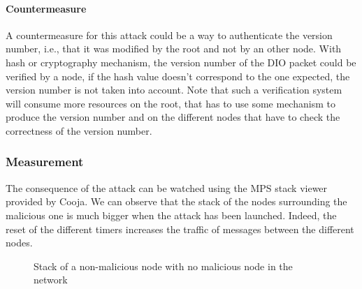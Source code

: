 \documentclass[11pt]{report}
\begin{document}
\paragraph{Countermeasure}
A countermeasure for this attack could be a way to authenticate the
version number, i.e., that it was modified by the root and not by an
other node. With hash or cryptography mechanism, the version number of
the \textsc{DIO} packet could be verified by a node, if the hash value doesn't
correspond to the one expected, the version number is not taken into
account. Note that such a verification system will consume more
resources on the root, that has to use some mechanism to produce the
version number and on the different nodes that have to check the
correctness of the version number.

\subsubsection{Measurement}
The consequence of the attack can be watched using the MPS stack viewer
provided by Cooja. We can observe that the stack of the nodes
surrounding the malicious one is much bigger when the attack has been
launched. Indeed, the reset of the different timers increases the
traffic of messages between the different nodes.


\begin{figure}

    \caption{Stack of a non-malicious node with no malicious node in the network}
\label{fig:vna1}
\end{figure}
\end{document}
